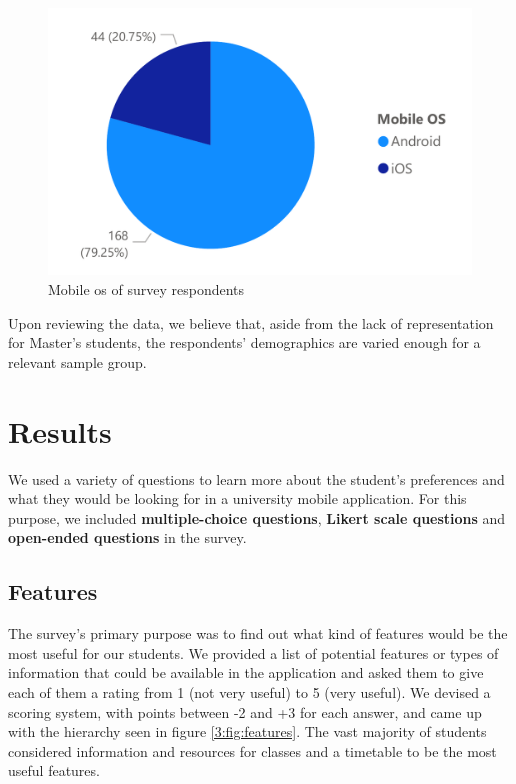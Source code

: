 \begin{figure}[ht]
    \centering
         \includegraphics[height=0.2\textheight]{figures/charts/survey/os.pdf}
    \caption{Mobile \acrshort{os} of survey respondents}
    \label{3:fig:os}
\end{figure}

Upon reviewing the data, we believe that, aside from the lack of representation for Master's students, the respondents' demographics are varied enough for a relevant sample group.

\section{Results} \label{3:results}

We used a variety of questions to learn more about the student's preferences and what they would be looking for in a university mobile application. For this purpose, we included \textbf{multiple-choice questions}, \textbf{Likert scale questions} and \textbf{open-ended questions} in the survey.

\subsection{Features} \label{3:features}

The survey's primary purpose was to find out what kind of features would be the most useful for our students. We provided a list of potential features or types of information that could be available in the application and asked them to give each of them a rating from 1 (not very useful) to 5 (very useful). We devised a scoring system, with points between -2 and +3 for each answer, and came up with the hierarchy seen in figure \ref{3:fig:features}. The vast majority of students considered information and resources for classes and a timetable to be the most useful features.

